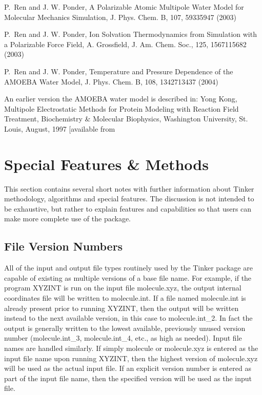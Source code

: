 \documentclass[letterpaper,11pt,english]{sphinxmanual}
\begin{document}
P. Ren and J. W. Ponder, A Polarizable Atomic Multipole Water Model for Molecular Mechanics Simulation, J. Phys. Chem. B, 107, 5933\sphinxhyphen{}5947 (2003)

P. Ren and J. W. Ponder, Ion Solvation Thermodynamics from Simulation with a Polarizable Force Field, A. Grossfield, J. Am. Chem. Soc., 125, 15671\sphinxhyphen{}15682 (2003)

P. Ren and J. W. Ponder, Temperature and Pressure Dependence of the AMOEBA Water Model, J. Phys. Chem. B, 108, 13427\sphinxhyphen{}13437 (2004)

An earlier version the AMOEBA water model is described in: Yong Kong, Multipole Electrostatic Methods for Protein Modeling with Reaction Field Treatment, Biochemistry \& Molecular Biophysics, Washington University, St. Louis, August, 1997 {[}available from \sphinxurl{http://dasher.wustl.edu/ponder/}{]}


\chapter{Special Features \& Methods}
\label{\detokenize{text/special-features:special-features-methods}}\label{\detokenize{text/special-features::doc}}
This section contains several short notes with further information about Tinker methodology, algorithms and special features. The discussion is not intended to be exhaustive, but rather to explain features and capabilities so that users can make more complete use of the package.


\section{File  Version Numbers}
\label{\detokenize{text/special-features:file-version-numbers}}
All of the input and output file types routinely used by the Tinker package are capable of existing as multiple versions of a base file name. For example, if the program XYZINT is run on the input file molecule.xyz, the output internal coordinates file will be written to molecule.int. If a file named molecule.int is already present prior to running XYZINT, then the output will be written instead to the next available version, in this case to molecule.int\_2. In fact the output is generally written to the lowest available, previously unused version number (molecule.int\_3, molecule.int\_4, etc., as high as needed). Input file names are handled similarly. If simply molecule or molecule.xyz is entered as the input file name upon running XYZINT, then the highest version of molecule.xyz will be used as the actual input file. If an explicit version number is entered as part of the input file name, then the specified version will be used as the input file.
\end{document}
